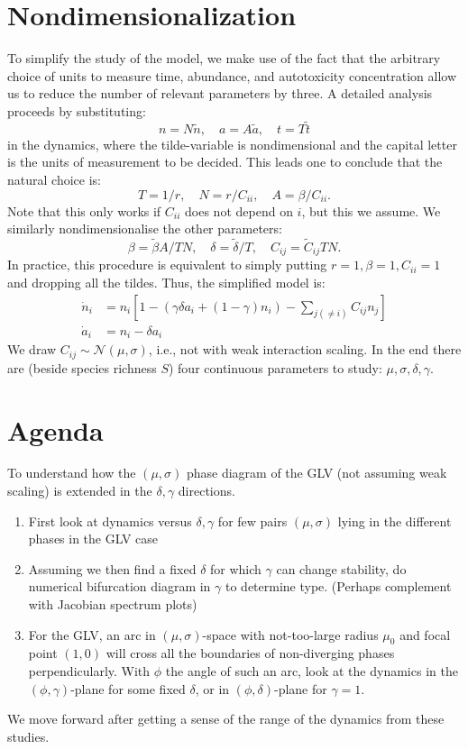 \documentclass{article}
\begin{document}
\section{Nondimensionalization}
To simplify the study of the model, we make use of the fact that the arbitrary choice of units to measure time, abundance, and autotoxicity concentration allow us to reduce the number of relevant parameters by three. A detailed analysis proceeds by substituting:
\begin{equation}
n = N\tilde{n}, \quad a = A\tilde{a}, \quad t= T\tilde{t}
\end{equation}
in the dynamics, where the tilde-variable is nondimensional and the capital letter is the units of measurement to be decided. This leads one to conclude that the natural choice is:
\begin{equation}
T = 1/r, \quad N= r/C_{ii}, \quad A=\beta/C_{ii}.
\end{equation}
Note that this only works if $C_{ii}$ does not depend on $i$, but this we assume. We similarly nondimensionalise the other parameters:
\begin{equation}
\beta = \tilde{\beta}A/TN, \quad \delta = \tilde{\delta}/T, \quad C_{ij} = \tilde{C}_{ij}TN.
\end{equation}
In practice, this procedure is equivalent to simply putting $r=1,\beta=1,C_{ii}=1$ and dropping all the tildes. Thus, the simplified model is:
\begin{align}
\dot{n}_i &= n_i\left[ 1 - \left(\gamma \delta a_i + (1-\gamma)n_i\right) - \sum_{j(\neq i)} C_{ij} n_j \right] \\
\dot{a}_i &= n_i - \delta a_i
\end{align}
We draw $C_{ij}\sim \mathcal{N}(\mu,\sigma)$, i.e., not with weak interaction scaling. In the end there are (beside species richness $S$) four continuous parameters to study: $\mu,\sigma,\delta,\gamma$.

\section{Agenda}
To understand how the $(\mu,\sigma)$ phase diagram of the GLV (not assuming weak scaling) is extended in the $\delta,\gamma$ directions.
\begin{enumerate}
    \item First look at dynamics versus $\delta,\gamma$ for few pairs $(\mu,\sigma)$ lying in the different phases in the GLV case
    \item Assuming we then find a fixed $\delta$ for which $\gamma$ can change stability, do numerical bifurcation diagram in $\gamma$ to determine type. (Perhaps complement with Jacobian spectrum plots)
    \item For the GLV, an arc in $(\mu,\sigma)$-space with not-too-large radius $\mu_0$ and focal point $(1,0)$ will cross all the boundaries of non-diverging phases perpendicularly. With $\phi$ the angle of such an arc, look at the dynamics in the $(\phi,\gamma)$-plane for some fixed $\delta$, or in $(\phi,\delta)$-plane for $\gamma=1$.
\end{enumerate}

We move forward after getting a sense of the range of the dynamics from these studies.
\end{document}
